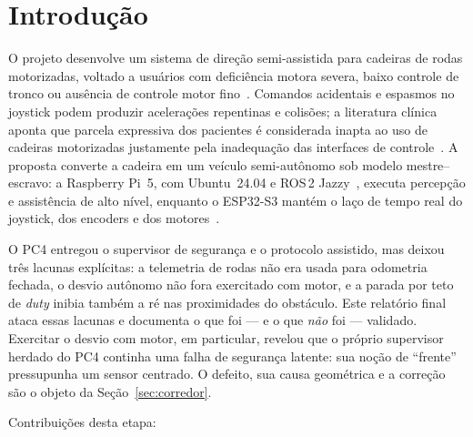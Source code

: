 \documentclass[conference]{IEEEtran}
\begin{document}
\section{Introdução}

O projeto desenvolve um sistema de direção semi-assistida para cadeiras de rodas
motorizadas, voltado a usuários com deficiência motora severa, baixo controle de
tronco ou ausência de controle motor fino~\cite{fehr2000,branco2018}. Comandos
acidentais e espasmos no joystick podem produzir acelerações repentinas e
colisões; a literatura clínica aponta que parcela expressiva dos pacientes é
considerada inapta ao uso de cadeiras motorizadas justamente pela inadequação das
interfaces de controle~\cite{fehr2000}. A proposta converte a cadeira em um
veículo semi-autônomo sob modelo mestre--escravo: a Raspberry Pi~5, com
Ubuntu~24.04 e ROS\,2 Jazzy~\cite{ros2docs}, executa percepção e assistência de
alto nível, enquanto o ESP32-S3 mantém o laço de tempo real do joystick, dos
encoders e dos motores~\cite{ogata2010}.

O PC4 entregou o supervisor de segurança e o protocolo assistido, mas deixou três
lacunas explícitas: a telemetria de rodas não era usada para odometria fechada, o
desvio autônomo não fora exercitado com motor, e a parada por teto de \emph{duty}
inibia também a ré nas proximidades do obstáculo. Este relatório final ataca
essas lacunas e documenta o que foi --- e o que \emph{não} foi --- validado.
Exercitar o desvio com motor, em particular, revelou que o próprio supervisor
herdado do PC4 continha uma falha de segurança latente: sua noção de ``frente''
pressupunha um sensor centrado. O defeito, sua causa geométrica e a correção são
o objeto da Seção~\ref{sec:corredor}.

Contribuições desta etapa:
\end{document}
